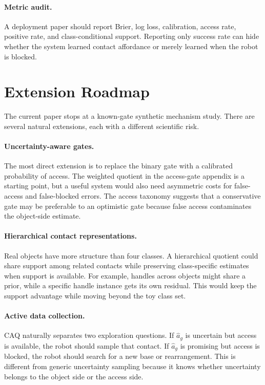 \documentclass{article}
\newcommand{\aff}{a}
\begin{document}
\paragraph{Metric audit.}
A deployment paper should report Brier, log loss, calibration, access rate, positive rate, and class-conditional support. Reporting only success rate can hide whether the system learned contact affordance or merely learned when the robot is blocked.

\section{Extension Roadmap}

The current paper stops at a known-gate synthetic mechanism study. There are several natural extensions, each with a different scientific risk.

\paragraph{Uncertainty-aware gates.}
The most direct extension is to replace the binary gate with a calibrated probability of access. The weighted quotient in the access-gate appendix is a starting point, but a useful system would also need asymmetric costs for false-access and false-blocked errors. The access taxonomy suggests that a conservative gate may be preferable to an optimistic gate because false access contaminates the object-side estimate.

\paragraph{Hierarchical contact representations.}
Real objects have more structure than four classes. A hierarchical quotient could share support among related contacts while preserving class-specific estimates when support is available. For example, handles across objects might share a prior, while a specific handle instance gets its own residual. This would keep the support advantage while moving beyond the toy class set.

\paragraph{Active data collection.}
CAQ naturally separates two exploration questions. If $\hat{\aff}_g$ is uncertain but access is available, the robot should sample that contact. If $\hat{\aff}_g$ is promising but access is blocked, the robot should search for a new base or rearrangement. This is different from generic uncertainty sampling because it knows whether uncertainty belongs to the object side or the access side.
\end{document}
